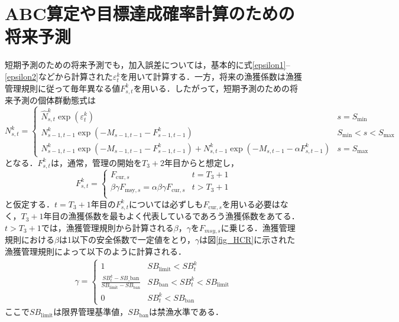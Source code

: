 \documentclass[11pt]{jsarticle}
\begin{document}
\section{ABC算定や目標達成確率計算のための将来予測}
短期予測のための将来予測でも，加入誤差については，基本的に式\ref{epsilon1}--\ref{epsilon2}などから計算された$\varepsilon_t^k$を用いて計算する．一方，将来の漁獲係数は漁獲管理規則に従って毎年異なる値$F_{s,t}^k$を用いる．したがって，短期予測のための将来予測の個体群動態式は
\begin{equation}
  N_{s,t}^k = \begin{cases}
      \hat{N}_{s,t}^k \exp (\varepsilon_t^k) &     s = S_\mathrm{min} \\    
      N_{s-1, t-1}^k  \exp(-M_{s-1,t-1}- F_{s-1,t-1}^k )  &    S_\mathrm{min} < s < S_\mathrm{max} \\
      N_{s-1, t-1}^k  \exp(-M_{s-1,t-1}- F_{s-1,t-1}^k ) + N_{s,t-1}^k  \exp(-M_{s,t-1} - \alpha F_{s,t-1}^k) &   s=S_{\mathrm{max}}
  \end{cases}
  \label{future_eq3}
\end{equation}
となる．$F_{s,t}^k$は，通常，管理の開始を$T_{3}+2$年目からと想定し，
\begin{equation}
  F_{s,t}^k = \begin{cases}
   F_{\mathrm{cur},s} &     t = T_3+1 \\    
   \beta \gamma  F_{\mathrm{msy},s} = \alpha \beta \gamma F_{\mathrm{cur},s}
   &     t > T_3+1 \\
  \end{cases}
  \label{future_eq3}
\end{equation}
と仮定する．$t=T_3+1$年目の$F_{s,t}^k$については必ずしも$F_{\mathrm{cur},s}$を用いる必要はなく，$T_3+1$年目の漁獲係数を最もよく代表しているであろう漁獲係数をあてる．$t>T_3+1$では，漁獲管理規則から計算される$\beta$，$\gamma$を$F_{msy,s}$に乗じる．漁獲管理規則における$\beta$は1以下の安全係数で一定値をとり，$\gamma$は図\ref{fig_HCR}に示された漁獲管理規則によって以下のように計算される．
\begin{eqnarray}
  \gamma =
  \begin{cases}
    1   &  S\!B_{\mathrm{limit}} < S\!B_t^k \\
    \frac{S\!B_t^k-S\!B\_{\mathrm{ban}}}{S\!B_{\mathrm{limit}} -S\!B_{\mathrm{ban}}}  & S\!B_{\mathrm{ban}} < S\!B_t^k< S\!B_{\mathrm{limit}} \\
    0    &   S\!B_t^k < S\!B_{\mathrm{ban}}
  \end{cases}
\end{eqnarray}
ここで$S\!B_{\mathrm{limit}}$は限界管理基準値，$S\!B_{\mathrm{ban}}$は禁漁水準である．
\end{document}
